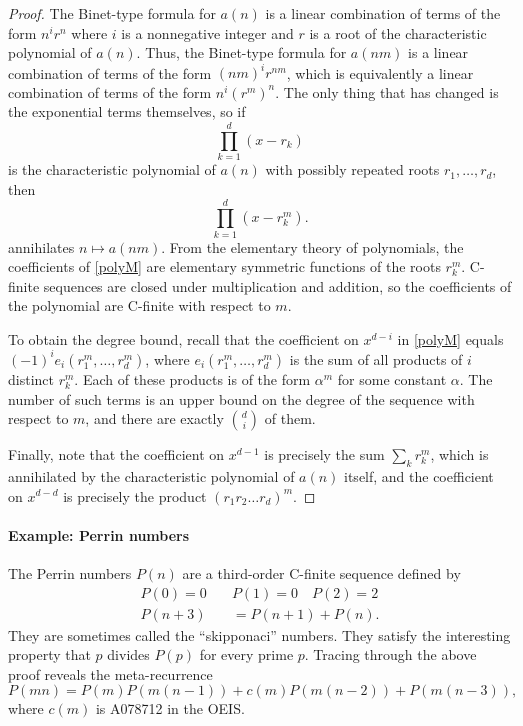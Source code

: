 \documentclass[12pt]{article}
\begin{document}
\begin{proof}
    The Binet-type formula for $a(n)$ is a linear combination of terms of the
    form $n^i r^n$ where $i$ is a nonnegative integer and $r$ is a root of the
    characteristic polynomial of $a(n)$. Thus, the Binet-type formula for
    $a(nm)$ is a linear combination of terms of the form $(nm)^i r^{nm}$, which
    is equivalently a linear combination of terms of the form $n^i (r^m)^n$.
    The only thing that has changed is the exponential terms themselves, so if
    \begin{equation*}
        \prod_{k = 1}^d (x - r_k)
    \end{equation*}
    is the characteristic polynomial of $a(n)$ with possibly repeated roots
    $r_1, \dots, r_d$, then
    \begin{equation}
        \label{polyM}
        \prod_{k = 1}^d (x - r_k^m).
    \end{equation}
    annihilates $n \mapsto a(nm)$. From the elementary theory of polynomials,
    the coefficients of \eqref{polyM} are elementary symmetric functions of the
    roots $r_k^m$. C-finite sequences are closed under multiplication and
    addition, so the coefficients of the polynomial are C-finite with respect
    to $m$.

    To obtain the degree bound, recall that the coefficient on $x^{d - i}$ in
    \eqref{polyM} equals $(-1)^i e_i(r_1^m, \dots, r_d^m)$, where $e_i(r_1^m,
    \dots, r_d^m)$ is the sum of all products of $i$ distinct $r_k^m$. Each of
    these products is of the form $\alpha^m$ for some constant $\alpha$. The
    number of such terms is an upper bound on the degree of the sequence with
    respect to $m$, and there are exactly ${d \choose i}$ of them.

    Finally, note that the coefficient on $x^{d - 1}$ is precisely the sum
    $\sum_k r_k^m$, which is annihilated by the characteristic polynomial of
    $a(n)$ itself, and the coefficient on $x^{d - d}$ is precisely the product
    $(r_1 r_2 \dots r_d)^m$.
\end{proof}

\paragraph{Example: Perrin numbers} The Perrin numbers $P(n)$ are a third-order
C-finite sequence defined by
\begin{align*}
    P(0) = 0 \quad &P(1) = 0 \quad P(2) = 2 \\
    P(n + 3) &= P(n + 1) + P(n).
\end{align*}
They are sometimes called the ``skipponaci'' numbers. They satisfy the
interesting property that $p$ divides $P(p)$ for every prime $p$. Tracing
through the above proof reveals the meta-recurrence
\begin{equation}
    \label{perrin-rec}
    P(mn) = P(m) P(m(n - 1)) + c(m) P(m(n - 2)) + P(m(n - 3)),
\end{equation}
where $c(m)$ is A078712 in the OEIS.
\end{document}
